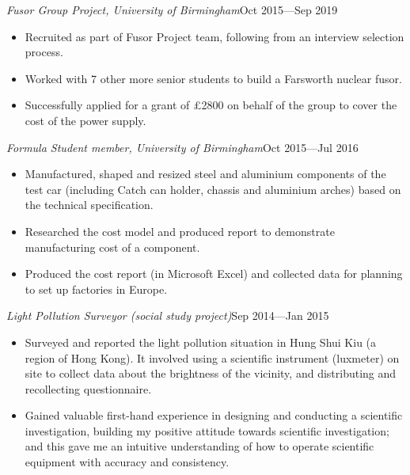 \documentclass[a4paper, 12pt]{article}
\newcommand{\expentry}[3]{\emph{#1}\hfill{#2}---{#3}}
\begin{document}
\expentry{Fusor Group Project, University of Birmingham}{Oct 2015}{Sep 2019}
    \begin{itemize}
    \setlength\itemsep{0em}
    \item Recruited as part of Fusor Project team, following from an interview selection process.
    \item Worked with 7 other more senior students to build a Farsworth nuclear fusor.
    \item Successfully applied for a grant of \pounds 2800 on behalf of the group to cover the cost of the power supply. 
    \end{itemize}
\expentry{Formula Student member, University of Birmingham}{Oct 2015}{Jul 2016}
    \begin{itemize}
    \setlength\itemsep{0em}
    \item Manufactured, shaped and resized steel and aluminium components of the test car (including Catch can holder, chassis and aluminium arches) based on the technical specification.
    \item Researched the cost model and produced report to demonstrate manufacturing cost of a component.
    \item Produced the cost report (in Microsoft Excel) and collected data for planning to set up factories in Europe.
    \end{itemize}
\expentry{Light Pollution Surveyor (social study project)}{Sep 2014}{Jan 2015}
    \begin{itemize}
    \setlength\itemsep{0em}
    \item Surveyed and reported the light pollution situation in Hung Shui Kiu (a region of Hong Kong). It involved using a scientific instrument (luxmeter) on site to collect data about the brightness of the vicinity, and distributing and recollecting questionnaire.
    \item Gained valuable first-hand experience in designing and conducting a scientific investigation, building my positive attitude towards scientific investigation; and this gave me an intuitive understanding of how to operate scientific equipment with accuracy and consistency.
    \end{itemize}
\end{document}
